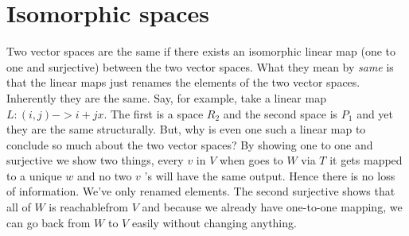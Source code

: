 \documentclass{report}
\begin{document}
\section{Isomorphic spaces}
Two vector spaces are the same if there exists an isomorphic linear map (one to one and surjective) between the two vector spaces. What they mean by \textit{same} is that the linear maps just renames the elements of the two vector spaces. Inherently they are the same. Say, for example, take a linear map $L: (i,j) -> i + jx $. The first is a space $ R_{2}$ and the second space is $P_1$ and yet they are the same structurally. But, why is even one such a linear map to conclude so much about the two vector spaces? By showing one to one and surjective we show two things, every $v$  in $V$ when goes to $W$ via $T$ it gets mapped to a unique $w$ and no two $v$ 's will have the same output. Hence there is no loss of information. We've only renamed elements. The second surjective shows that all of $W$ is reachablefrom  $V$ and because we already have one-to-one mapping, we can go back from $W$ to $V$ easily without changing anything. 
\end{document}
